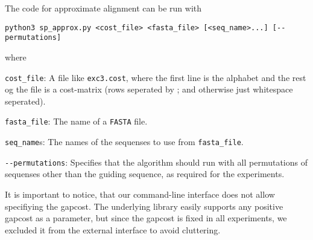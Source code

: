 The code for approximate alignment can be run with

\begin{verbatim}
python3 sp_approx.py <cost_file> <fasta_file> [<seq_name>...] [--permutations]
\end{verbatim}

where

\begin{description}
\item{\verb|cost_file|:} A file like \verb|exc3.cost|, where the
  first line is the alphabet and the rest og the file is a cost-matrix
  (rows seperated by ; and otherwise just whitespace seperated).
\item{\verb|fasta_file|:} The name of a \verb|FASTA| file.
\item{\verb|seq_name|s:} The names of the sequenses to use from
  \verb|fasta_file|.
\item{\verb|--permutations|:} Specifies that the algorithm should run
  with all permutations of sequenses other than the guiding sequence,
  as required for the experiments.
\end{description}

It is important to notice, that our command-line interface does not allow specifiying the gapcost. The underlying library easily supports any positive gapcost as a parameter, but since the gapcost is fixed in all experiments, we excluded it from the external interface to avoid cluttering. 
